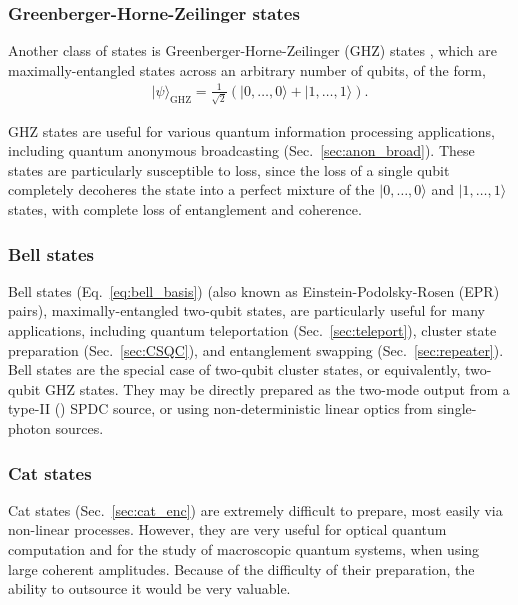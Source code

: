 \documentclass[aps,rmp,twocolumn,amsmath,amssymb,nofootinbib,superscriptaddress]{revtex4}
\newcommand{\ket}[1]{|#1\rangle}
\newcommand{\comment}[1]{{\color{blue}{\textbf{#1}}}}
\begin{document}
%
%

\subsubsection{Greenberger-Horne-Zeilinger states}

Another class of states is Greenberger-Horne-Zeilinger (GHZ) states \cite{???}, which are maximally-entangled states across an arbitrary number of qubits, of the form,
\begin{align}
\ket\psi_\mathrm{GHZ} = \frac{1}{\sqrt{2}}(\ket{0,\dots,0} + \ket{1,\dots,1}).
\end{align}

GHZ states are useful for various quantum information processing applications, including quantum anonymous broadcasting (Sec.~\ref{sec:anon_broad}). These states are particularly susceptible to loss, since the loss of a single qubit completely decoheres the state into a perfect mixture of the \mbox{$\ket{0,\dots,0}$} and \mbox{$\ket{1,\dots,1}$} states, with complete loss of entanglement and coherence.

%
%

\subsubsection{Bell states}

Bell states (Eq.~\ref{eq:bell_basis}) (also known as Einstein-Podolsky-Rosen (EPR) pairs), maximally-entangled two-qubit states, are particularly useful for many applications, including quantum teleportation (Sec.~\ref{sec:teleport}), cluster state preparation (Sec.~\ref{sec:CSQC}), and entanglement swapping (Sec.~\ref{sec:repeater}). Bell states are the special case of two-qubit cluster states, or equivalently, two-qubit GHZ states. They may be directly prepared as the two-mode output from a type-II (\comment{Type-I or type-II???}) SPDC source, or using non-deterministic linear optics from single-photon sources.

%
%

\subsubsection{Cat states}

Cat states (Sec.~\ref{sec:cat_enc}) are extremely difficult to prepare, most easily via non-linear processes. However, they are very useful for optical quantum computation and for the study of macroscopic quantum systems, when using large coherent amplitudes. Because of the difficulty of their preparation, the ability to outsource it would be very valuable.
\end{document}
